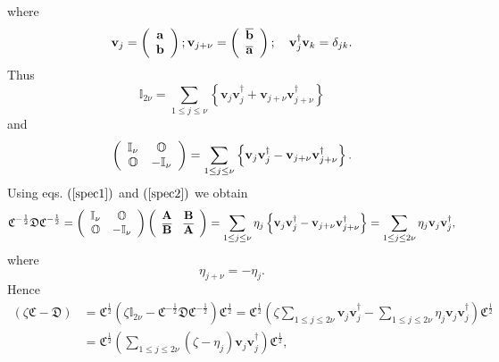 \documentclass[aps,preprint]{revtex4}%
\begin{document}
where
\begin{equation}
\mathbf{v}_{j}=\left(
\begin{array}
[c]{c}%
\mathbf{a}\\
\mathbf{b}%
\end{array}
\right)  ;\mathbf{v}_{j+\nu}=\left(
\begin{array}
[c]{c}%
\overline{\mathbf{b}}\\
\overline{\mathbf{a}}%
\end{array}
\right)  ;\quad\mathbf{v}_{j}^{\dagger}\mathbf{v}_{k}=\delta_{jk}.
\end{equation}
Thus
\begin{equation}
\mathbb{I}_{2\nu}=\sum_{1\leq j\leq\nu}\left\{  \mathbf{v}_{j}\mathbf{v}%
_{j}^{\dagger}+\mathbf{v}_{j+\nu}\mathbf{v}_{j+\nu}^{\dagger}\right\}
\end{equation}
and
\begin{equation}
\left(
\begin{array}
[c]{cc}%
\mathbb{I}_{\nu} & \mathbb{O}\\
\mathbb{O} & -\mathbb{I}_{\nu}%
\end{array}
\right)  =\sum_{1\leq j\leq\nu}\left\{  \mathbf{v}_{j}\mathbf{v}_{j}^{\dagger
}-\mathbf{v}_{j+\nu}\mathbf{v}_{j+\nu}^{\dagger}\right\}  . \label{spec2}%
\end{equation}
Using eqs. $\left(  \ref{spec1}\right)  $ and $\left(  \ref{spec2}\right)  $
we obtain
\begin{equation}
\mathfrak{C}^{-\frac{1}{2}}\mathfrak{DC}^{-\frac{1}{2}}=\left(
\begin{array}
[c]{cc}%
\mathbb{I}_{\nu} & \mathbb{O}\\
\mathbb{O} & -\mathbb{I}_{\nu}%
\end{array}
\right)  \left(
\begin{array}
[c]{cc}%
\mathbf{A} & \mathbf{B}\\
\overline{\mathbf{B}} & \overline{\mathbf{A}}%
\end{array}
\right)  =\sum_{1\leq j\leq\nu}\eta_{j}\left\{  \mathbf{v}_{j}\mathbf{v}%
_{j}^{\dagger}-\mathbf{v}_{j+\nu}\mathbf{v}_{j+\nu}^{\dagger}\right\}
=\sum_{1\leq j\leq2\nu}\eta_{j}\mathbf{v}_{j}\mathbf{v}_{j}^{\dagger},
\end{equation}
where
\begin{equation}
\eta_{j+\nu}=-\eta_{j}.
\end{equation}
Hence
\begin{align}
\left(  \zeta\mathfrak{C}-\mathfrak{D}\right)   &  =\mathfrak{C}^{\frac{1}{2}%
}\left(  \zeta\mathbb{I}_{2\nu}-\mathfrak{C}^{-\frac{1}{2}}\mathfrak{DC}%
^{-\frac{1}{2}}\right)  \mathfrak{C}^{\frac{1}{2}}=\mathfrak{C}^{\frac{1}{2}%
}\left(  \zeta\sum_{1\leq j\leq2\nu}\mathbf{v}_{j}\mathbf{v}_{j}^{\dagger
}-\sum_{1\leq j\leq2\nu}\eta_{j}\mathbf{v}_{j}\mathbf{v}_{j}^{\dagger}\right)
\mathfrak{C}^{\frac{1}{2}}\\
&  =\mathfrak{C}^{\frac{1}{2}}\left(  \sum_{1\leq j\leq2\nu}\left(  \zeta
-\eta_{j}\right)  \mathbf{v}_{j}\mathbf{v}_{j}^{\dagger}\right)
\mathfrak{C}^{\frac{1}{2}},
\end{align}
\end{document}
